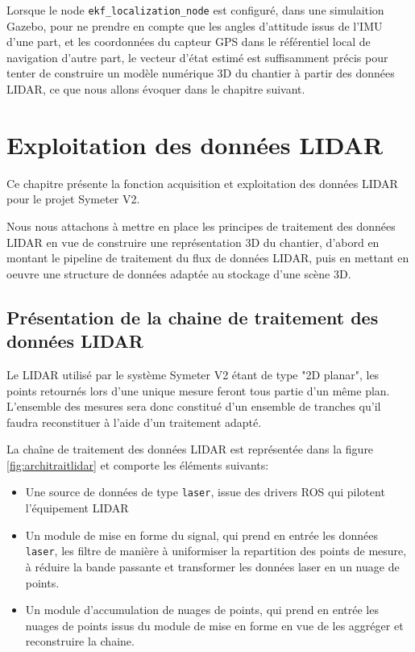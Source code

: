 \documentclass[12pt,a4paper]{report}
\begin{document}
	\para Lorsque le node \verb|ekf_localization_node| est configuré, dans une simulaition Gazebo, pour ne prendre en compte que les angles d'attitude issus de l'IMU d'une part, et les coordonnées du capteur GPS dans le référentiel local de navigation d'autre part, le vecteur d'état estimé est suffisamment précis pour tenter de construire un modèle numérique 3D du chantier à partir des données LIDAR, ce que nous allons évoquer dans le chapitre suivant.

	
	
\chapter{Exploitation des données LIDAR}

Ce chapitre présente la fonction acquisition et exploitation des données LIDAR pour le projet Symeter V2. 

\para Nous nous attachons à mettre en place les principes de traitement des données LIDAR en vue de construire une représentation 3D du chantier, d'abord en montant le pipeline de traitement du flux de données LIDAR, puis en mettant en oeuvre une structure de données adaptée au stockage d'une scène 3D.

	\section{Présentation de la chaine de traitement des données LIDAR}
	Le LIDAR utilisé par le système Symeter V2 étant de type "2D planar", les points retournés lors d'une unique mesure feront tous partie d'un même plan. L'ensemble des mesures sera donc constitué d'un ensemble de tranches qu'il faudra reconstituer à l'aide d'un traitement adapté.
	
	La chaîne de traitement des données LIDAR est représentée dans la figure \ref{fig:architraitlidar} et comporte les éléments suivants:
	\begin{itemize}
		\item Une source de données de type \verb|laser|, issue des drivers ROS qui pilotent l'équipement LIDAR
		
		\item Un module de mise en forme du signal, qui prend en entrée les données \verb|laser|, les filtre de manière à uniformiser la repartition des points de mesure, à réduire la bande passante et transformer les données laser en un nuage de points.
		
		\item Un module d'accumulation de nuages de points, qui prend en entrée les nuages de points issus du module de mise en forme en vue de les aggréger et reconstruire la chaine.
	\end{itemize}
\end{document}

